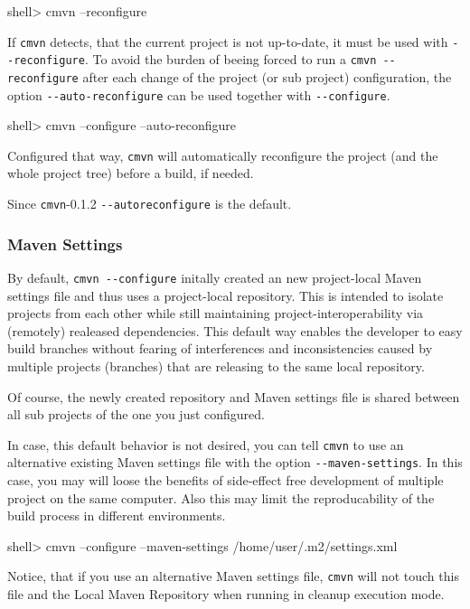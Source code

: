 \documentclass[a4paper,12pt,english,oneside,halfparskip]{scrartcl}
\newcommand{\cmvn}{\texttt{cmvn}}
\newcommand{\code}[1]{\texttt{#1}}
\newcommand{\cmdoption}[1]{\code{-{}-#1}}
\begin{document}
\begin{Cmdline}
shell> cmvn --reconfigure
\end{Cmdline}

If \cmvn{} detects, that the current project is not up-to-date, it must be used with \cmdoption{reconfigure}. To avoid the burden of beeing forced to run a \code{cmvn -{}-reconfigure} after each change of the project (or sub project) configuration, the option \cmdoption{auto-reconfigure} can be used together with \cmdoption{configure}. 

\begin{Cmdline}
shell> cmvn --configure --auto-reconfigure
\end{Cmdline}

Configured that way, \cmvn{} will automatically reconfigure the project (and the whole project tree) before a build, if needed.

Since \cmvn{}-0.1.2 \cmdoption{autoreconfigure} is the default.

\subsubsection{Maven Settings}

By default, \code{cmvn -{}-configure} initally created an new project-local Maven settings file and thus uses a project-local repository. This is intended to isolate projects from each other while still maintaining project-interoperability via (remotely) realeased dependencies. This default way enables the developer to easy build branches without fearing of interferences and inconsistencies caused by multiple projects (branches) that are releasing to the same local repository. 

Of course, the newly created repository and Maven settings file is shared between all sub projects of the one you just configured.

In case, this default behavior is not desired, you can tell \cmvn{} to use an alternative existing Maven settings file with the option \cmdoption{maven-settings}. In this case, you may will loose the benefits of side-effect free development of multiple project on the same computer. Also this may limit the reproducability of the build process in different environments. 

\begin{Cmdline}
shell> cmvn --configure --maven-settings /home/user/.m2/settings.xml
\end{Cmdline}

Notice, that if you use an alternative Maven settings file, \cmvn{} will not touch this file and the Local Maven Repository when running in cleanup execution mode.
\end{document}
